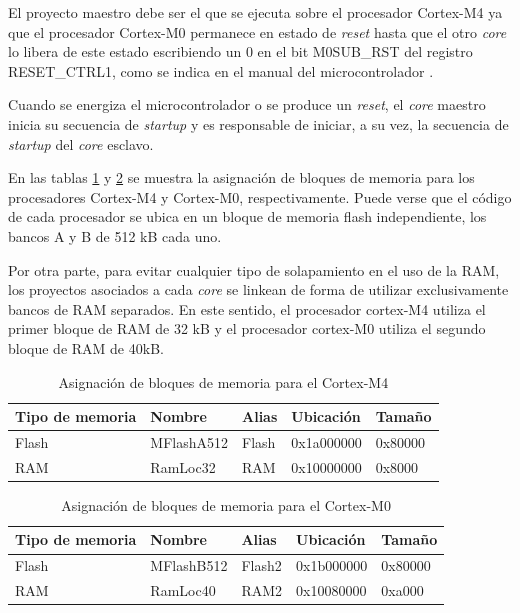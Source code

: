 El proyecto maestro debe ser el que se ejecuta sobre el procesador Cortex-M4 ya que el procesador Cortex-M0 permanece en estado de \textit{reset} hasta que el otro \textit{core} lo libera de este estado escribiendo un 0 en el bit M0SUB\_RST del registro RESET\_CTRL1, como se indica en el manual del microcontrolador \citep{nxp:lpc4337}.

Cuando se energiza el microcontrolador o se produce un \textit{reset}, el \textit{core} maestro inicia su secuencia de \textit{startup} y es responsable de iniciar, a su vez, la secuencia de \textit{startup} del \textit{core} esclavo.  

En las tablas \ref{tab:memoriaM4} y \ref{tab:memoriaM0} se muestra la asignación de bloques de memoria para los procesadores Cortex-M4 y Cortex-M0, respectivamente.  Puede verse que el código de cada procesador se ubica en un bloque de memoria flash independiente, los bancos A y B de 512 kB cada uno.  

Por otra parte, para evitar cualquier tipo de solapamiento en el uso de la RAM, los proyectos asociados a cada \textit{core} se linkean de forma de utilizar exclusivamente bancos de RAM separados.  En este sentido, el procesador cortex-M4 utiliza el primer bloque de RAM de 32 kB y el procesador cortex-M0 utiliza el segundo bloque de RAM de 40kB.

\begin{table}[ht]
\centering
\caption{Asignación de bloques de memoria para el Cortex-M4}
\begin{tabular}{lllll}
\toprule
\textbf{Tipo de memoria} & \textbf{Nombre} & \textbf{Alias} & \textbf{Ubicación} & \textbf{Tamaño} \\ 
\midrule
Flash                    & MFlashA512      & Flash          & 0x1a000000         & 0x80000         \\
RAM                      & RamLoc32        & RAM            & 0x10000000         & 0x8000          \\ 
\bottomrule
\end{tabular}
\label{tab:memoriaM4}
\end{table}

\begin{table}[ht]
\centering
\caption{Asignación de bloques de memoria para el Cortex-M0}
\begin{tabular}{lllll}
\toprule
\textbf{Tipo de memoria} & \textbf{Nombre} & \textbf{Alias} & \textbf{Ubicación} & \textbf{Tamaño} \\ 
\midrule
Flash                    & MFlashB512      & Flash2          & 0x1b000000         & 0x80000         \\
RAM                      & RamLoc40        & RAM2            & 0x10080000         & 0xa000          \\ 
\bottomrule
\end{tabular}
\label{tab:memoriaM0}
\end{table}

